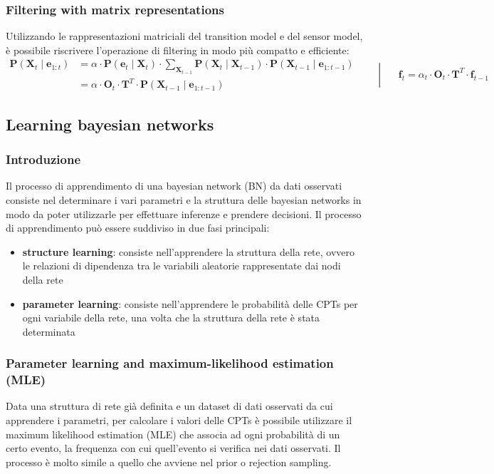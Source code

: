 \subsubsection*{Filtering with matrix representations}
Utilizzando le rappresentazioni matriciali del transition model e del sensor model, è possibile riscrivere l'operazione di
filtering in modo più compatto e efficiente:
\[\begin{aligned}
	\textbf{P}(\textbf{X}_t \mid\textbf{e}_{1:t}) &= \alpha \cdot \textbf{P}(\textbf{e}_t \mid \textbf{X}_t) \cdot \sum_{\textbf{X}_{t-1}} \textbf{P}(\textbf{X}_t \mid \textbf{X}_{t-1}) \cdot \textbf{P}(\textbf{X}_{t-1} \mid \textbf{e}_{1:t-1}) \\
	&= \alpha \cdot \textbf{O}_t \cdot \textbf{T}^T \cdot \textbf{P}(\textbf{X}_{t-1} \mid \textbf{e}_{1:t-1})
\end{aligned} \qquad\left|\phantom{\int^{a}}\right. \textbf{f}_t = \alpha_t \cdot \textbf{O}_t \cdot \textbf{T}^T \cdot \textbf{f}_{t-1}\]

\newpage

\subsection{Learning bayesian networks}
\subsubsection*{Introduzione}
Il processo di apprendimento di una bayesian network (BN) da dati osservati consiste nel determinare i vari parametri e la
struttura delle bayesian networks in modo da poter utilizzarle per effettuare inferenze e prendere decisioni. Il processo
di apprendimento può essere suddiviso in due fasi principali:
\begin{itemize}
	\item \textbf{structure learning}: consiste nell'apprendere la struttura della rete, ovvero le relazioni di dipendenza
	tra le variabili aleatorie rappresentate dai nodi della rete
	\item \textbf{parameter learning}: consiste nell'apprendere le probabilità delle CPTs per ogni variabile della rete, una
	volta che la struttura della rete è stata determinata
\end{itemize}

\subsubsection*{Parameter learning and maximum-likelihood estimation (MLE)}
Data una struttura di rete già definita e un dataset di dati osservati da cui apprendere i parametri, per calcolare i valori
delle CPTs è possibile utilizzare il maximum likelihood estimation (MLE) che associa ad ogni probabilità di un certo evento,
la frequenza con cui quell'evento si verifica nei dati osservati. Il processo è molto simile a quello che avviene nel prior
o rejection sampling.


